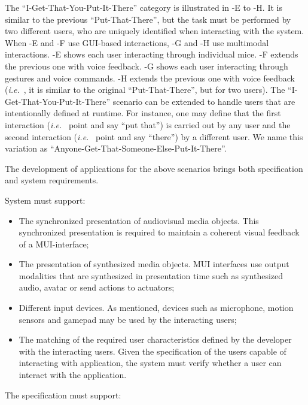 The “I-Get-That-You-Put-It-There” category is illustrated in
-E to -H. It is similar to the previous
“Put-That-There”, but the task must be performed by two different users, who are
uniquely identified when interacting with the system. When -E
and -F use GUI-based interactions, -G and
-H use multimodal interactions. -E shows
each user interacting through individual mice. -F extends the
previous one with voice feedback. -G shows each user
interacting through gestures and voice commands. -H extends
the previous one with voice feedback (\textit{i.e.}~, it is similar to the original
“Put-That-There”, but for two users). The “I-Get-That-You-Put-It-There” scenario
can be extended to handle users that are intentionally defined at runtime. For
instance, one may define that the first interaction (\textit{i.e.}~ point and
say “put that”) is carried out by any user and the second interaction
(\textit{i.e.}~ point and say “there”) by a different user. We name this variation as “Anyone-Get-That-Someone-Else-Put-It-There”.

The development of applications for the above scenarios brings both
specification and system requirements.

System must support:

\begin{itemize}
	\item The synchronized presentation of audiovisual media objects. This
	synchronized presentation is required to maintain a coherent visual feedback
	of a MUI-interface;
	\item The presentation of synthesized media objects. MUI interfaces use output
	modalities that are synthesized in presentation time such as synthesized
	audio, avatar or send actions to actuators;
	\item Different input devices. As mentioned, devices such as microphone,
	motion sensors and gamepad may be used by the interacting users;
	\item The matching of the required user characteristics defined by the
	developer with the interacting users. Given the specification of the users
	capable of interacting with application, the system must verify whether a user
	can interact with the application.
\end{itemize}

The specification must support:

